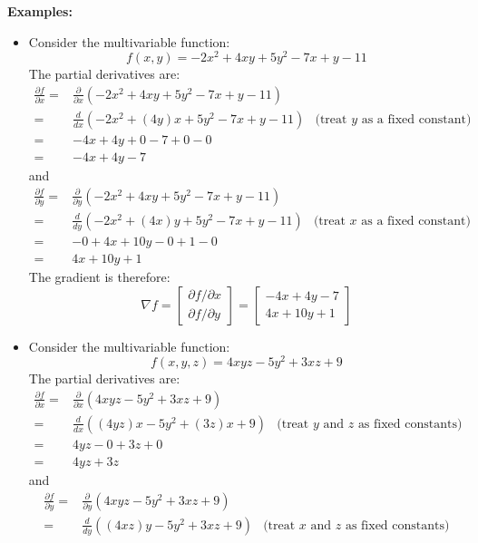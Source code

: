 \documentclass{article}
\begin{document}
\textbf{Examples:}
\begin{itemize}
\item Consider the multivariable function:
\[f(x, y) = -2x^2 + 4xy + 5y^2 - 7x + y - 11\]
The partial derivatives are:
\begin{align*}
\frac{\partial f}{\partial x} = & \frac{\partial}{\partial x}(-2x^2 + 4xy + 5y^2 - 7x + y - 11) \\ 
= & \frac{d}{dx}(-2x^2 + (4y)x + 5y^2 - 7x + y - 11) & \text{(treat \(y\) as a fixed constant)} \\ 
= & -4x + 4y + 0 - 7 + 0 - 0 \\
= & -4x + 4y - 7 
\end{align*}
and
\begin{align*}
\frac{\partial f}{\partial y} = & \frac{\partial}{\partial y}(-2x^2 + 4xy + 5y^2 - 7x + y - 11) \\ 
= & \frac{d}{dy}(-2x^2 + (4x)y + 5y^2 - 7x + y - 11) & \text{(treat \(x\) as a fixed constant)} \\ 
= & -0 + 4x + 10y - 0 + 1 - 0 \\
= & 4x + 10y + 1  
\end{align*}
The gradient is therefore:
\[\nabla f = \begin{bmatrix}
\partial f/\partial x \\ 
\partial f/\partial y \end{bmatrix} = \begin{bmatrix}
-4x + 4y - 7 \\ 
4x + 10y + 1 
\end{bmatrix}\]
\item Consider the multivariable function:
\[f(x, y, z) = 4xyz - 5y^2 + 3xz + 9\]
The partial derivatives are:
\begin{align*}
\frac{\partial f}{\partial x} = & \frac{\partial}{\partial x}(4xyz - 5y^2 + 3xz + 9) \\ 
= & \frac{d}{dx}((4yz)x - 5y^2 + (3z)x + 9) & \text{(treat \(y\) and \(z\) as fixed constants)} \\ 
= & 4yz - 0 + 3z + 0 \\ 
= & 4yz + 3z 
\end{align*}
and
\begin{align*}
\frac{\partial f}{\partial y} = & \frac{\partial}{\partial y}(4xyz - 5y^2 + 3xz + 9) \\ 
= & \frac{d}{dy}((4xz)y - 5y^2 + 3xz + 9) & \text{(treat \(x\) and \(z\) as fixed constants)} \\ 

\end{align*}
\end{itemize}
\end{document}
